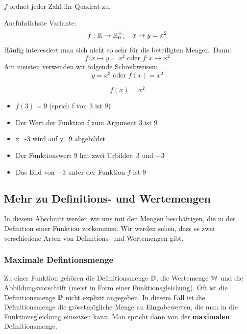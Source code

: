 \begin{example}
    \begin{center}
        $f$ ordnet jeder Zahl ihr Quadrat zu.
    \end{center}
    Ausführlichste Variante:
    \[f: \operatorname{\mathbb{R}} \to \operatorname{\mathbb{R}}^+_0; \quad x \mapsto y = x^2\]
    Häufig interessiert man sich nicht so sehr für die beteiligten Mengen. Dann:
    \[f: x \mapsto y = x^2 \text{ oder } f: x \mapsto x^2\]
    Am meisten verwenden wir folgende Schreibweisen:
    \[y= x^2 \text{ oder } f(x) = x^2\]
\end{example}

\begin{example}
    \[f(x) = x^2\]
    \begin{itemize}
        \item $f(3)=9$ (sprich \glqq f von 3 ist 9\grqq{})
        \item \glqq Der Wert der Funktion f zum Argument 3 ist 9\grqq{}
        \item \glqq x=-3 wird auf y=9 abgebildet \grqq{}
        \item \glqq Der Funktionswert $9$ hat zwei Urbilder: $3$ und $-3$\grqq{}
        \item \glqq Das Bild von $-3$ unter der Funktion $f$ ist $9$\grqq{}
    \end{itemize}
\end{example}
\newpage

\subsection{Mehr zu Definitions- und Wertemengen}
In diesem Abschnitt werden wir uns mit den Mengen beschäftigen, die in der Definition einer Funktion vorkommen. Wir werden sehen, dass es zwei verschiedene Arten von Definitions- und Wertemengen gibt.
\subsubsection{Maximale Defintionsmenge}
Zu einer Funktion gehören die Definitionsmenge $\operatorname{\mathbb{D}}$, die Wertemenge $\operatorname{\mathbb{W}}$ und die Abbildungsvorschrift (meist in Form einer Funktionsgleichung). Oft ist die Definitionsmenge $\operatorname{\mathbb{D}}$ nicht explizit angegeben. In diesem Fall ist die Definitionsmenge die grösstmögliche Menge an Eingabewerten, die man in die Funktionsgleichung einsetzen kann. Man spricht dann von der \textbf{maximalen} Definitionsmenge.

